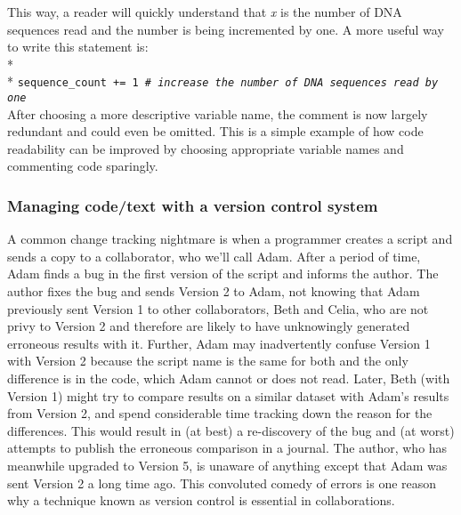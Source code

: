 \documentclass[ChapterTOCs,krantz2]{krantz} %
\begin{document}
This way, a reader will quickly understand that \emph{x} is the number of DNA
sequences read and the number is being incremented by one.  A more useful way
to write this statement is:\\* \\*
\texttt{sequence\_count += 1 \emph{\# increase the number of DNA sequences read by one}}\\

\noindent
After choosing a more descriptive variable name, the comment is now largely
redundant and could even be omitted. 
This is a simple example of how code readability can be improved 
by choosing appropriate variable names and commenting code sparingly.

\subsubsection{Managing code/text with a version control system}

A common change tracking nightmare 
is when a programmer creates a script 
and sends a copy to a collaborator, who we'll call Adam. After a period of time, 
Adam finds a bug in the first version of the script and informs
the author. The author fixes the bug and sends Version 2
to Adam, not knowing that Adam
previously sent Version 1 to other collaborators, Beth and Celia, who are not privy to Version 2 
and therefore are likely to have unknowingly generated erroneous results with it.  
Further, Adam may inadvertently confuse Version 1
with Version 2 because the script name is the same for both and
the only difference is in the code, which Adam cannot or does not read. Later, 
Beth (with Version 1) might try to compare
results on a similar dataset with Adam's results from Version 2,
and spend considerable time tracking down the reason for the differences.
This would result in (at best) a re-discovery of the bug and (at
worst) attempts to publish the erroneous comparison in a journal.  The author, 
who has meanwhile upgraded to Version 5, 
is unaware of anything except that 
Adam was sent Version 2 a long time ago.  This convoluted 
comedy of errors is one reason why a technique known as version control is essential in collaborations.
\end{document}
